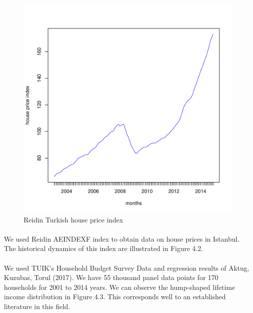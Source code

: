 \documentclass[]{elsarticle}
\begin{document}
\begin{figure}
\begin{minipage}{0.45\textwidth}
		\includegraphics[scale=0.4]{figs/reidin.pdf}
		\caption{Reidin Turkish house price index}
	\end{minipage}
\end{figure}

\paragraph{}We used Reidin AEINDEXF index to obtain data on house prices in Istanbul. The historical dynamics of this index are illustrated in Figure 4.2.

\paragraph{}We used TUIK's Household Budget Survey Data and regression results of Aktug, Kuzubas, Torul (2017). We have 55 thousand panel data points for 170 households for 2001 to 2014 years. We can observe the hump-shaped lifetime income distribution in Figure 4.3. This corresponds well to an established literature in this field.
\end{document}
